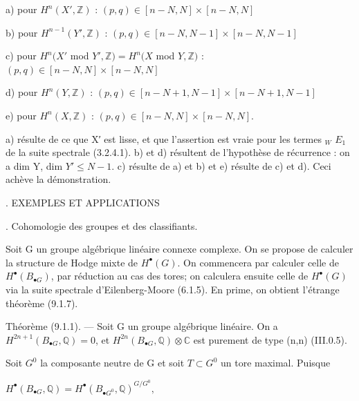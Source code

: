 \documentclass[11pt,twoside]{article}
\newcommand{\DFormula}[1]{%
  \par\smallskip\noindent\hspace*{0pt}\(\displaystyle #1\)\par\smallskip
}
\begin{document}
a) pour \(H^{n}(X′,\mathbb{Z})\) : \((p,q)\in [n−N,N]\times [n−N,N]\)\par
\par\medskip
b) pour \(H^{n−1}(Y′,\mathbb{Z})\) : \((p,q)\in [n−N,N−1]\times [n−N,N−1]\)\par
\par\medskip
c) pour \(H^{n}(X′\) mod \(Y′,\mathbb{Z})=H^{n}(X\) mod \(Y,\mathbb{Z})\) : \((p,q)\in [n−N,N]\times [n−N,N]\)\par
\par\medskip
d) pour \(H^{n}(Y,\mathbb{Z})\) : \((p,q)\in [n−N+1,N−1]\times [n−N+1,N−1]\)\par
\par\medskip
e) pour \(H^{n}(X,\mathbb{Z})\) : \((p,q)\in [n−N,N]\times [n−N,N]\).\par
\par\medskip
a) résulte de ce que X′ est lisse, et que l’assertion est vraie pour les termes \(_{W}\) \(E_{1}\) de la suite spectrale (3.2.4.1). b) et d) résultent de l’hypothèse de récurrence : on a dim Y, dim \(Y′\leq N−1\). c) résulte de a) et b) et e) résulte de c) et d). Ceci achève la démonstration.\par
\par{}. EXEMPLES ET APPLICATIONS\par
\par{}. Cohomologie des groupes et des classifiants.\par
\par\medskip
Soit G un groupe algébrique linéaire connexe complexe. On se propose de calculer la structure de Hodge mixte de \(H^{\bullet }(G)\). On commencera par calculer celle de \(H^{\bullet }(B_{\bullet G})\), par réduction au cas des tores; on calculera ensuite celle de \(H^{\bullet }(G)\) via la suite spectrale d’Eilenberg-Moore (6.1.5). En prime, on obtient l’étrange théorème (9.1.7).\par
\par\medskip
Théorème (9.1.1). — Soit G un groupe algébrique linéaire. On a \(H^{2n+1}(B_{\bullet G},\mathbb{Q})=0\), et \(H^{2n}(B_{\bullet G},\mathbb{Q})\otimes \mathbb{C}\) est purement de type (n,n) (III.0.5).\par
\par\medskip
Soit \(G^{0}\) la composante neutre de G et soit \(T\subset G^{0}\) un tore maximal. Puisque\par
\par\medskip
\DFormula{H^{\bullet }(B_{\bullet G},\mathbb{Q})=H^{\bullet }(B_{\bullet G^{0}},\mathbb{Q})^{G/G^{0}},}
\end{document}
